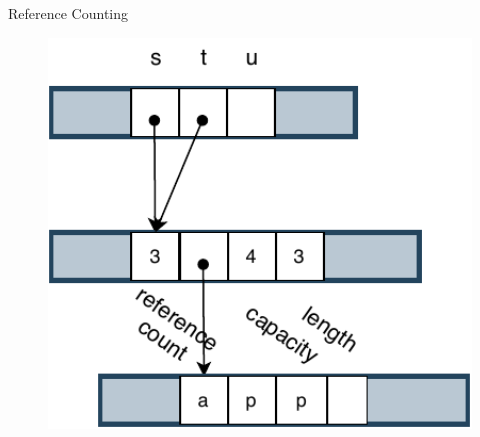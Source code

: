 \documentclass[9pt]{beamer}
\begin{document}
\begin{frame}[t, fragile]{Reference Counting}
\begin{minipage}{0.3\linewidth}
\begin{figure}[hp]
        \end{figure}
    \end{minipage}     
    \begin{minipage}{0.3\linewidth}
        \begin{figure}[hp]
            \centering
            \begin{center}
                    \includegraphics[width=1.0\textwidth]{images/rc2.pdf}
                    \captionsetup{labelformat=empty}
            \end{center}
            

\end{figure}
\end{minipage}
\end{frame}
\end{document}
